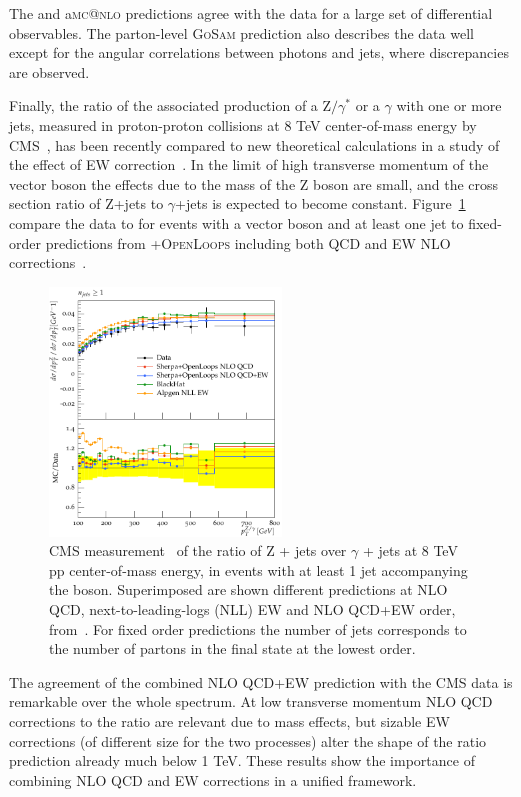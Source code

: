 \documentclass{PoS}
\makeatletter
\providecommand{\OPENLOOPS} {{\textsc{OpenLoops}}\xspace}
\newcommand{\AMCATNLO} {a{\textsc{mc@nlo}}\xspace}
\newcommand{\GOSAM} {{\textsc{GoSam}}\xspace}
\makeatother
\begin{document}
The \SHERPA and
\AMCATNLO predictions agree with the data for a large set of differential 
observables. The parton-level \GOSAM prediction also describes the data well except for the angular correlations between
photons and jets, where discrepancies are observed.

Finally, the ratio of the associated production of a $\mathrm{Z}/\gamma^*$ or a $\gamma$ with one or more jets, measured in
proton-proton collisions at 8 TeV center-of-mass energy by CMS~\cite{Khachatryan:2015ira}, has been recently compared to
new theoretical calculations in a study of the effect of EW correction~\cite{Badger:2016bpw}.
In the limit of high transverse momentum of the vector boson the effects due to the mass of the Z
boson are small, and the cross section ratio of Z+jets to $\gamma$+jets is expected to become constant. 
Figure~\ref{zgrNLO} compare the data to for events with a vector boson and at least one
jet to fixed-order predictions from \SHERPA+\OPENLOOPS including both QCD and EW NLO corrections~\cite{Kallweit:2014xda,Kallweit:2015dum}. 
\begin{figure}
\begin{center}
\includegraphics[width=0.55\textwidth]{Figure14.pdf} 
 \caption{CMS measurement~\cite{Khachatryan:2015ira} of the ratio of Z + jets over $\gamma$ + jets at 8 TeV pp
   center-of-mass energy, in events with at least 1 jet accompanying the
   boson. Superimposed are shown different predictions at NLO QCD,
   next-to-leading-logs (NLL) EW and NLO QCD+EW order, from~\cite{Badger:2016bpw}. 
   For fixed order predictions the number of jets corresponds to the
   number of partons in the final state at the lowest order.} 
\label{zgrNLO}
\end{center}
\end{figure}
The agreement of the combined NLO QCD+EW prediction with the CMS data is
remarkable over the whole spectrum. At low transverse momentum
NLO QCD corrections to the ratio are relevant due to mass effects, but sizable
EW corrections (of different size for the two processes) alter the shape of the ratio prediction already much below 1
TeV. These results show the importance of combining NLO QCD and EW corrections in a unified framework.
\end{document}
